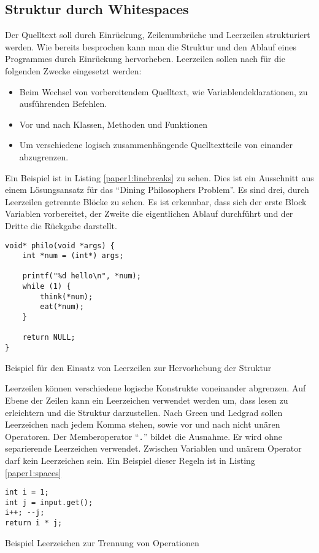 \subsection{Struktur durch Whitespaces}
Der Quelltext soll durch Einrückung, Zeilenumbrüche und Leerzeilen strukturiert werden. Wie bereits besprochen kann man die Struktur und den Ablauf eines Programmes durch Einrückung hervorheben. Leerzeilen sollen nach \cite[S. 6f.]{Green} für die folgenden Zwecke eingesetzt werden:
\begin{itemize}
\item Beim Wechsel von vorbereitendem Quelltext, wie Variablendeklarationen, zu ausführenden Befehlen.
\item Vor und nach Klassen, Methoden und Funktionen
\item Um verschiedene logisch zusammenhängende Quelltextteile von einander abzugrenzen.
\end{itemize}
Ein Beispiel ist in Listing \ref{paper1:linebreaks} zu sehen. Dies ist ein Ausschnitt aus einem Lösungsansatz für das \enquote{Dining Philosophers Problem}\cite{Chandy}. Es sind drei, durch Leerzeilen getrennte Blöcke zu sehen. Es ist erkennbar, dass sich der erste Block Variablen vorbereitet, der Zweite die eigentlichen Ablauf durchführt und der Dritte die Rückgabe darstellt.
\begin{listing}[H]
\begin{verbatim}
void* philo(void *args) {
    int *num = (int*) args;

    printf("%d hello\n", *num);
    while (1) {
        think(*num);
        eat(*num);
    }

    return NULL;
}
\end{verbatim}
\label{paper1:linebreaks}
\caption{Beispiel für den Einsatz von Leerzeilen zur Hervorhebung der Struktur}
\end{listing}

Leerzeilen können verschiedene logische Konstrukte voneinander abgrenzen. Auf Ebene der Zeilen kann ein Leerzeichen verwendet werden um, dass lesen zu erleichtern und die Struktur darzustellen.
Nach Green und Ledgrad\cite[S. 7]{Green} sollen Leerzeichen nach jedem Komma stehen, sowie vor und nach nicht unären Operatoren. Der Memberoperator \enquote{\texttt{.}} bildet die Ausnahme. Er wird ohne separierende Leerzeichen verwendet. Zwischen Variablen und unärem Operator darf kein Leerzeichen sein. Ein Beispiel dieser Regeln ist in Listing \ref{paper1:spaces} 

\begin{listing}[H]
    \begin{verbatim}
int i = 1;
int j = input.get();
i++; --j;
return i * j;
    \end{verbatim}
    \label{paper1:spaces}
    \caption{Beispiel Leerzeichen zur Trennung von Operationen}
\end{listing}

